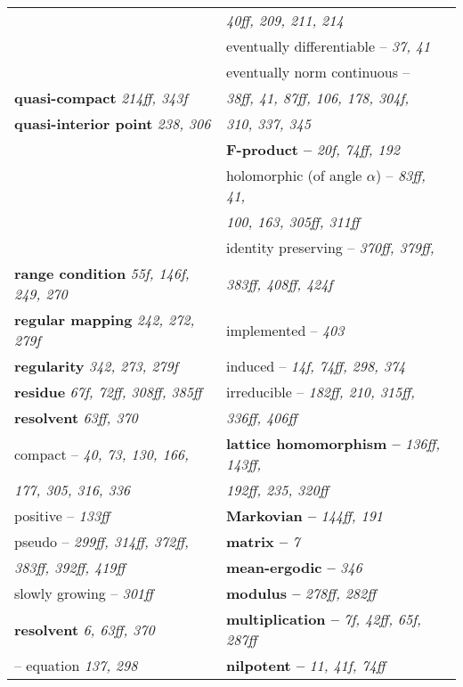 \documentclass{article}
\begin{document}
\begin{longtable}{p{}p{}}
& \quad\quad \textit{40ff, 209, 211, 214} \\
& \quad eventually differentiable -- \textit{37, 41} \\
& \quad eventually norm continuous -- \\
\textbf{quasi-compact} \textit{214ff, 343f} & \quad\quad \textit{38ff, 41, 87ff, 106, 178, 304f,} \\
\textbf{quasi-interior point} \textit{238, 306} & \quad\quad \textit{310, 337, 345} \\
& \textbf{F-product --} \textit{20f, 74ff, 192} \\
& \quad holomorphic (of angle $ \alpha $) -- \textit{83ff, 41,} \\
& \quad\quad \textit{100, 163, 305ff, 311ff} \\
& \quad identity preserving -- \textit{370ff, 379ff,} \\
\textbf{range condition} \textit{55f, 146f, 249, 270} & \quad\quad \textit{383ff, 408ff, 424f} \\
\textbf{regular mapping} \textit{242, 272, 279f} & \quad implemented -- \textit{403} \\
\textbf{regularity} \textit{342, 273, 279f} & \quad induced -- \textit{14f, 74ff, 298, 374} \\
\textbf{residue} \textit{67f, 72ff, 308ff, 385ff} & \quad irreducible -- \textit{182ff, 210, 315ff,} \\
\textbf{resolvent} \textit{63ff, 370} & \quad\quad \textit{336ff, 406ff} \\
\quad compact -- \textit{40, 73, 130, 166,} & \textbf{lattice homomorphism --} \textit{136ff, 143ff,} \\
\quad\quad \textit{177, 305, 316, 336} & \quad\quad \textit{192ff, 235, 320ff} \\
\quad positive -- \textit{133ff} & \textbf{Markovian --} \textit{144ff, 191} \\
\quad pseudo -- \textit{299ff, 314ff, 372ff,} & \textbf{matrix --} \textit{7} \\
\quad\quad \textit{383ff, 392ff, 419ff} & \textbf{mean-ergodic --} \textit{346} \\
\quad slowly growing -- \textit{301ff} & \textbf{modulus --} \textit{278ff, 282ff} \\
\textbf{resolvent} \textit{6, 63ff, 370} & \textbf{multiplication --} \textit{7f, 42ff, 65f, 287ff} \\
\quad -- equation \textit{137, 298} & \textbf{nilpotent --} \textit{11, 41f, 74ff} \\

\end{longtable}
\end{document}
